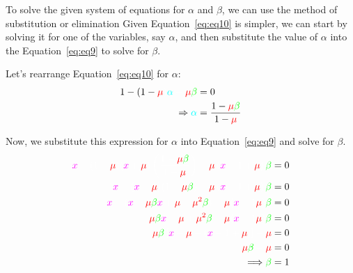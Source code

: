 To solve the given system of equations for $\alpha$ and $\beta$, we can use the method of substitution or elimination Given Equation~\eqref{eq:eq10} is simpler, we can start by solving it for one of the variables, say $\alpha$, and then substitute the value of $\alpha$ into the Equation~\eqref{eq:eq9} to solve for $\beta$.

\vspace{\baselineskip}

Let's rearrange Equation~\eqref{eq:eq10} for $\alpha$:
\begin{align}
    1 - (1- \cred\mu\cw) \cc \alpha \cw - \cred \mu \cg \beta \cw & = 0 \nonumber                                      \\
    \Rightarrow \cc \alpha \cw                                    & = \frac{1 - \cred \mu \cg \beta \cw}{1- \cred \mu}
    \label{eq:eq11}
\end{align}

Now, we substitute this expression for $\alpha$ into Equation~\eqref{eq:eq9} and solve for $\beta$.
\begin{align*}
    \cm x \cw - (1 - \cred \mu \cw)(\cm x \cw + \cred \mu \cw) \left( \ddfrac{1 - \cred \mu \cg\beta}{1 - \cred \mu} \right) - \cred \mu \cw \left(\cm x \cw - 1 + \cred\mu\cw\right) \cg \beta \cw & = 0
    \\
    \cm x \cw - (\cm x \cw + \cred \mu \cw)(1 - \cred \mu \cg\beta\cw) - \cred \mu \cw \left(\cm x \cw - 1 + \cred\mu\cw\right) \cg \beta \cw                                                       & = 0
    \\
    \cm x \cw - (\cm x \cw - \cred \mu \cg \beta \cm x \cw + \cred \mu \cw - \cred \mu^2 \cg \beta \cw) -
    \cred \mu \cw (\cm x \cw - 1 \cred \mu \cw) \cg \beta \cw                                                                                                                                       & = 0
    \\
    \cred \mu \cg \beta \cm x \cw - \cred \mu \cw + \cred \mu^2 \cg \beta \cw
    - \cred \mu \cw (\cm x \cw - 1 \cred \mu \cw) \cg \beta \cw                                                                                                                                     & = 0
    \\
    \cred\mu\cg\beta \cw \left[\cm x \cw + \cred \mu \cw
    - (\cm x \cw - 1 + \cred \mu \cw)\right] - \cred \mu \cw                                                                                                                                        & = 0
    \\
    \cred \mu \cg \beta \cw - \cred \mu \cw                                                                                                                                                         & = 0
    \\
    \Longrightarrow \cg \beta \cw                                                                                                                                                                   & = 1
\end{align*}

